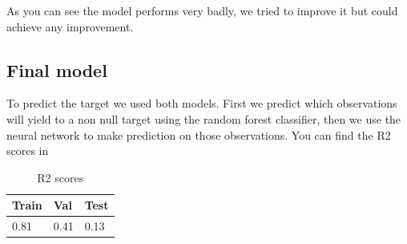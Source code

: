 \documentclass[a4paper, 12pt, one column]{article}
\begin{document}
As you can see the model performs very badly, we tried to improve it but could achieve any improvement.

\subsection{Final model}

To predict the target we used both models. First we predict which observations will yield to a non null target using the random forest classifier, then we use the neural network to make prediction on those observations. You can find the R2 scores in

\begin{table}[H]
\centering
\begin{tabular}{|l|l|l|}
    \hline
    Train & Val & Test\\ \hline
    0.81 & 0.41 & 0.13 \\ \hline
\end{tabular}
\caption{R2 scores}
\label{tab:R2_scores}
\end{table}
\end{document}
